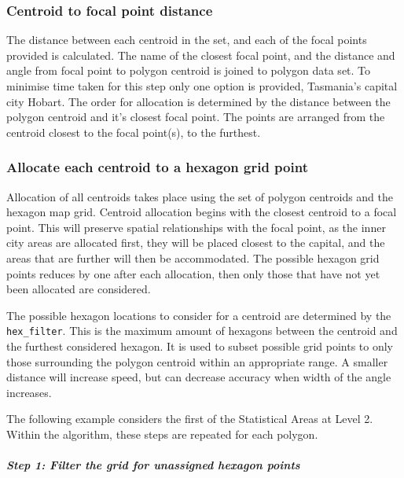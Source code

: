 \documentclass{monashthesis}
\begin{document}
\hypertarget{centroid-to-focal-point-distance}{%
\subsubsection{Centroid to focal point distance}\label{centroid-to-focal-point-distance}}

The distance between each centroid in the set, and each of the focal points provided is calculated. The name of the closest focal point, and the distance and angle from focal point to polygon centroid is joined to polygon data set. To minimise time taken for this step only one option is provided, Tasmania's capital city Hobart.
The order for allocation is determined by the distance between the polygon centroid and it's closest focal point. The points are arranged from the centroid closest to the focal point(s), to the furthest.

\hypertarget{allocate-each-centroid-to-a-hexagon-grid-point}{%
\subsubsection{Allocate each centroid to a hexagon grid point}\label{allocate-each-centroid-to-a-hexagon-grid-point}}

Allocation of all centroids takes place using the set of polygon centroids and the hexagon map grid.
Centroid allocation begins with the closest centroid to a focal point.
This will preserve spatial relationships with the focal point, as the inner city areas are allocated first, they will be placed closest to the capital, and the areas that are further will then be accommodated.
The possible hexagon grid points reduces by one after each allocation, then only those that have not yet been allocated are considered.

The possible hexagon locations to consider for a centroid are determined by the \texttt{hex\_filter}. This is the maximum amount of hexagons between the centroid and the furthest considered hexagon. It is used to subset possible grid points to only those surrounding the polygon centroid within an appropriate range. A smaller distance will increase speed, but can decrease accuracy when width of the angle increases.

The following example considers the first of the Statistical Areas at Level 2.
Within the algorithm, these steps are repeated for each polygon.

\hypertarget{step-1-filter-the-grid-for-unassigned-hexagon-points}{%
\subparagraph{Step 1: Filter the grid for unassigned hexagon points}\label{step-1-filter-the-grid-for-unassigned-hexagon-points}}
\end{document}
